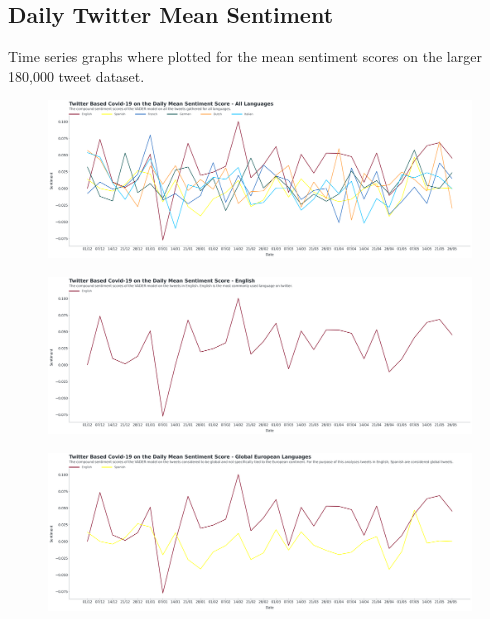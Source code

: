 \begin{landscape}
\newpage

\section{Daily Twitter Mean Sentiment}

Time series graphs where plotted for the mean sentiment scores on the larger 180,000 tweet dataset.

\begin{figure}[h!]
\includegraphics[scale=0.33]{Daily Mean All.png}
\caption[Daily Mean All]{ }
\label{fig:globalall}
\end{figure}


\begin{figure}[h!]
\includegraphics[scale=0.33]{Daily Mean English.png}
\caption[Daily Mean Global]{ }
\label{fig:Englishmeanap}
\end{figure}


\begin{figure}[h!]
\includegraphics[scale=0.33]{Daily Mean Global.png}
\caption[Daily Mean Global]{ }
\label{fig:globalmeanap}
\end{figure}



\end{landscape}
